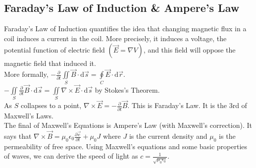 \subsection{Faraday's Law of Induction \& Ampere's Law}
\noindent
Faraday’s Law of Induction quantifies the idea that changing magnetic flux in a coil induces a current in the coil. More precisely, it induces a voltage, the potential function of electric field $\left(\vec{E}=\nabla V\right)$, and this field will oppose the magnetic field that induced it.\\
More formally, $-\frac{\partial}{\partial t}\iint\limits_{S}{\vec{B}\cdot\mathrm{d}\vec{s}}=\oint\limits_{C}{\vec{E}\cdot\mathrm{d}\vec{r}}$.\\
$-\iint\limits_{S}{\frac{\partial}{\partial t}\vec{B}\cdot\mathrm{d}\vec{s}}=\iint\limits_{S}{\nabla\times\vec{E}\cdot\mathrm{d}\vec{s}}$ by Stokes's Theorem.\\
As $S$ collapses to a point, $\nabla\times\vec{E}=-\frac{\partial}{\partial t}\vec{B}$. This is Faraday's Law. It is the 3rd of Maxwell's Laws.\\

\noindent
The final of Maxwell's Equations is Ampere's Law (with Maxwell's correction). It says that $\nabla\times\vec{B}=\mu_0\epsilon_0\frac{\partial\vec{e}}{\partial t}+\mu_0J$ where $J$ is the current density and $\mu_0$ is the permeability of free space. Using Maxwell's equations and some basic properties of waves, we can derive the speed of light as $c=\frac{1}{\sqrt{\mu_0\epsilon_0}}$.